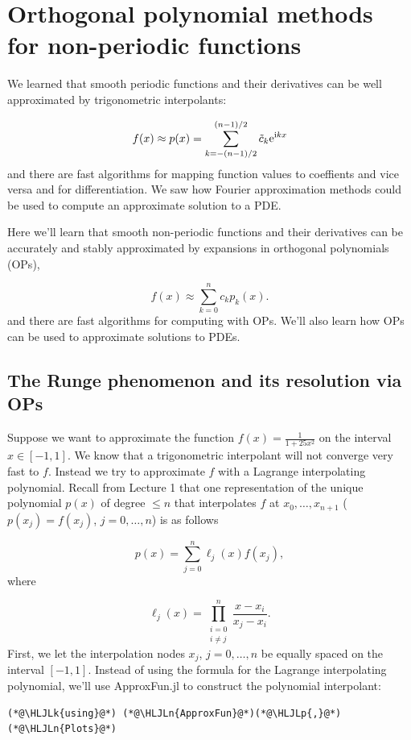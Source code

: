 \documentclass[12pt,a4paper]{article}
\newcommand{\HLJLk}[1]{\textcolor[RGB]{148,91,176}{\textbf{#1}}}
\newcommand{\HLJLn}[1]{#1}
\newcommand{\HLJLp}[1]{#1}
\begin{document}
\section{Orthogonal polynomial methods for non-periodic functions}
We learned that smooth periodic functions and their derivatives can be well approximated by trigonometric interpolants:

\[
f(x) \approx p(x) =  \sum_{k=-(n-1)/2}^{(n-1)/2} \tilde{c}_k{\rm e}^{{\rm i}kx}
\]
and there are fast algorithms for mapping function values to coeffients and vice versa and for differentiation.  We saw how Fourier approximation methods could be used to compute an approximate solution to a PDE.

Here we'll learn that smooth non-periodic functions and their derivatives can be accurately and stably approximated by expansions in orthogonal polynomials (OPs),

\[
f(x) \approx \sum_{k = 0}^{n}  c_k p_k(x).
\]
and there are  fast algorithms for computing with OPs.  We'll also learn how OPs can be used to approximate solutions to PDEs.

\subsection{The Runge phenomenon and its resolution via OPs}
Suppose we want to approximate the function $f(x) = \frac{1}{1 + 25x^2}$ on the interval $x \in[-1, 1]$.  We know that a trigonometric interpolant will not converge very fast to $f$.  Instead we try to approximate $f$ with a Lagrange interpolating polynomial.  Recall from Lecture 1 that one representation of the unique polynomial $p(x)$ of degree $\leq n$ that interpolates $f$ at $x_0, \ldots, x_{n+1}$   ($p(x_j) = f(x_j)$, $j = 0, \ldots, n$) is as follows

\[
p(x) = \sum_{j = 0}^{n} \ell_j(x) f(x_j),
\]
where

\[
\ell_j(x) = \prod_{\substack{i = 0 \\ i \neq j}}^{n}\frac{x-x_i}{x_j - x_i}.
\]
First, we let the interpolation nodes $x_j$, $j  = 0, \ldots, n$ be equally spaced on the interval $[-1, 1]$.  Instead of using the formula for the Lagrange interpolating polynomial, we'll use ApproxFun.jl to construct the polynomial interpolant:


\begin{lstlisting}
(*@\HLJLk{using}@*) (*@\HLJLn{ApproxFun}@*)(*@\HLJLp{,}@*) (*@\HLJLn{Plots}@*)
\end{lstlisting}
\end{document}
